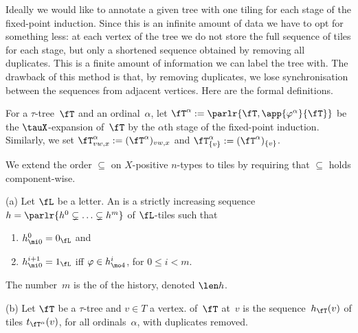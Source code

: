 \documentclass{LMCS}
\begin{document}
Ideally we would like to annotate a given tree with one tiling for each stage
of the fixed-point induction. Since this is an infinite amount of data we have
to opt for something less\?: at each vertex of the tree we do not store the
full sequence of tiles for each stage, but only a shortened sequence
obtained by removing all duplicates. This is a finite amount of information
we can label the tree with.
The drawback of this method is that, by removing duplicates,
we lose synchronisation between the sequences from adjacent vertices.
Here are the formal definitions.

For a $\tau$-tree~$\fT$ and an ordinal~$\alpha$,
let $\fT^{\alpha} := \parlr{\fT,\app{\varphi^{\alpha}}{\fT}}$
be the $\tauX$-expansion of~$\fT$
by the $\alpha$th stage of the fixed-point induction.
Similarly, we set $\fT^\alpha_{vw,x} := (\fT^\alpha)_{vw,x}$
and $\fT^\alpha_{\{v\}} := (\fT^\alpha)_{\{v\}}$.

We extend the order $\subseteq$ on $X$-positive $n$-types
to tiles by requiring that $\subseteq$ holds component-wise.

\begin{defi}
\textup{(a)}
Let $\fL$ be a letter.
An  is a strictly increasing sequence
$h=\parlr{h^0 \subsetneq \ldots \subsetneq h^m}$
of $\fL$-tiles such that
\begin{enumerate}
\item $h^0_{\mi0} = 0_{\fL}$ and
\item $h^{i+1}_{\mi0}=1_{\fL}$ iff $\varphi\in h^i_{\mo4}$, for $0\leq i<m$.
\end{enumerate}
The number~$m$ is the  of the history, denoted $\len h$.

\textup{(b)}
Let $\fT$ be a $\tau$-tree and $v \in T$ a vertex.
 of~$\fT$ at~$v$
is the sequence~$h_\fT(v)$ of tiles $t_{\fT^{\alpha}}(v)$,
for all ordinals~$\alpha$, with duplicates removed.
\end{defi}
\end{document}
